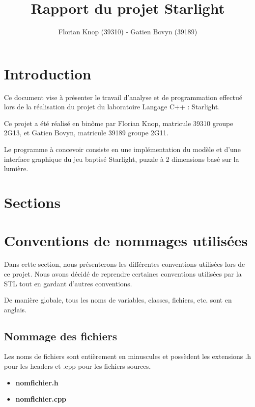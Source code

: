 \documentclass[]{article}
\title{Rapport du projet Starlight}
\author{Florian Knop (39310) - Gatien Bovyn (39189)}
\begin{document}
\maketitle

\newpage

\tableofcontents

\newpage

\section{Introduction}


Ce document vise à présenter le travail d’analyse et de programmation effectué
lors de la réalisation du projet du laboratoire Langage C++ : Starlight.

Ce projet a été réalisé en binôme par Florian Knop, matricule 39310 groupe 2G13,
et Gatien Bovyn, matricule 39189 groupe 2G11.

Le programme à concevoir consiste en une implémentation du modèle et d’une interface
graphique du jeu baptisé Starlight, puzzle à 2 dimensions basé sur la lumière.


\section{Sections}

\section{Conventions de nommages utilisées}

Dans cette section, nous présenterons les différentes conventions 
utilisées lors de ce projet. Nous avons décidé de reprendre certaines
conventions utilisées par la STL tout en gardant d'autres conventions.

De manière globale, tous les noms de variables, classes, fichiers, etc.
sont en anglais.

\subsection{Nommage des fichiers}

Les noms de fichiers sont entièrement en minuscules
et possèdent les extensions .h
pour les headers et .cpp pour les fichiers sources.

\begin{itemize}
	\item \textbf{nomfichier.h}
	\item \textbf{nomfichier.cpp}
\end{itemize}
\end{document}
